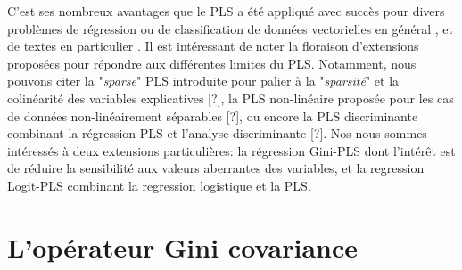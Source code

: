 C'est ses nombreux avantages que le PLS a été appliqué avec succès pour divers problèmes de régression \citep{lacroux2011avantagesPLS}
 ou de  classification de données vectorielles en général \citep{durif2017sparsePLSandLogit}, et de textes en particulier \citep{zeng2007textclassPLS}.
Il est intéressant de noter la floraison d'extensions proposées pour répondre aux différentes limites du PLS. Notamment, nous pouvons citer la "\textit{sparse}" PLS introduite pour palier à la "\textit{sparsité}" et la colinéarité des variables explicatives [?], la PLS non-linéaire proposée pour les cas de données non-linéairement séparables [?], ou encore la PLS discriminante combinant la régression PLS et l'analyse discriminante [?]. Nos nous sommes intéressés à deux extensions particulières: la régression Gini-PLS \citep{mussard2018ginipls} dont l'intérêt est de réduire la sensibilité aux valeurs aberrantes des variables, et la regression Logit-PLS \citep{tenenhaus2005logitpls}  combinant la regression logistique et la PLS.


\section{L'opérateur Gini covariance}

